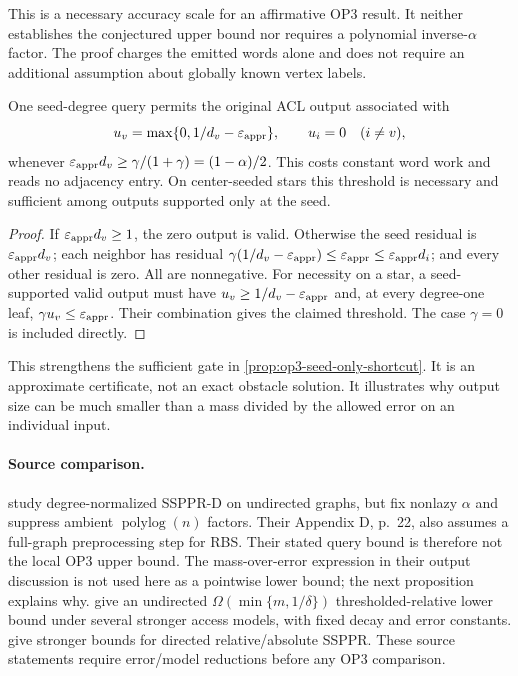 This is a necessary accuracy scale for an affirmative OP3 result. It
neither establishes the conjectured upper bound nor requires a polynomial
inverse-$\alpha$ factor. The proof charges the emitted words alone and
does not require an additional assumption about globally known vertex labels.

\begin{proposition}
\label{prop:op3-sharp-seed-only-gate}
One seed-degree query permits the original ACL output associated with
\[
 u_v=\max\{0,1/d_v-\varepsilon_{\mathrm{appr}}\},\qquad u_i=0\quad(i\ne v),
\]
whenever $\varepsilon_{\mathrm{appr}} d_v\geq\gamma/(1+\gamma)=(1-\alpha)/2$.
This costs constant word work and reads no adjacency entry.
On center-seeded stars this threshold is necessary and sufficient among
outputs supported only at the seed.
\end{proposition}
\begin{proof}
If $\varepsilon_{\mathrm{appr}} d_v\geq1$, the zero output is valid. Otherwise the seed
residual is $\varepsilon_{\mathrm{appr}} d_v$; each neighbor has residual
$\gamma(1/d_v-\varepsilon_{\mathrm{appr}})\leq\varepsilon_{\mathrm{appr}}\leq\varepsilon_{\mathrm{appr}} d_i$;
and every other residual is zero. All are nonnegative. For necessity on
a star, a seed-supported valid output must have
$u_v\geq1/d_v-\varepsilon_{\mathrm{appr}}$ and, at every degree-one leaf,
$\gamma u_v\leq\varepsilon_{\mathrm{appr}}$. Their combination gives the claimed
threshold. The case $\gamma=0$ is included directly.
\end{proof}

This strengthens the sufficient gate in
\cref{prop:op3-seed-only-shortcut}. It is an approximate certificate,
not an exact obstacle solution. It illustrates why output size can be
much smaller than a mass divided by the allowed error on an individual input.

\paragraph{Source comparison.}
\citet[Definitions 1--2 and Section 1.2, full-version pp.\ 2--3]{wei2024absolute}
study degree-normalized SSPPR-D on undirected graphs, but fix nonlazy
$\alpha$ and suppress ambient $\operatorname{polylog}(n)$ factors.
Their Appendix D, p.\ 22, also assumes a full-graph preprocessing step
for RBS. Their stated query bound is therefore not the local OP3 upper
bound. The mass-over-error expression in their output discussion is not
used here as a pointwise lower bound; the next proposition explains why.
\citet[Theorem 4.2.2, PDF p.\ 26]{bertram2026undirected} give an
undirected $\Omega(\min\{m,1/\delta\})$ thresholded-relative lower bound
under several stronger access models, with fixed decay and error constants.
\citet[Theorems 1.6 and 1.8, pp.\ 5--6]{jiang2026nearoptimality} give
stronger bounds for directed relative/absolute SSPPR. These source
statements require error/model reductions before any OP3 comparison.

